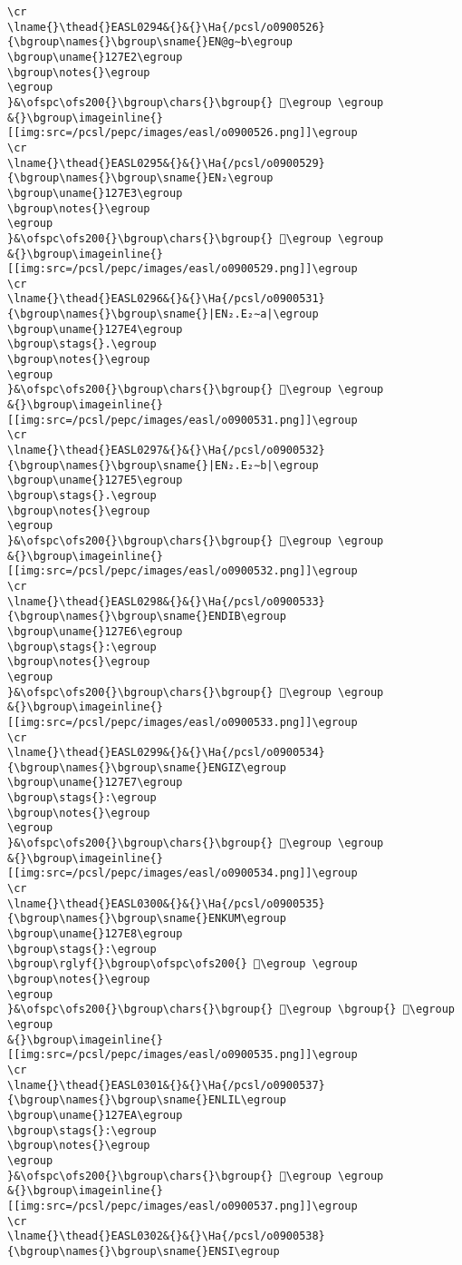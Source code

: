 \begin{verbatim}
\cr
\lname{}\thead{}EASL0294&{}&{}\Ha{/pcsl/o0900526}{\bgroup\names{}\bgroup\sname{}EN@g∼b\egroup
\bgroup\uname{}127E2\egroup
\bgroup\notes{}\egroup
\egroup
}&\ofspc\ofs200{}\bgroup\chars{}\bgroup{} 𒟢\egroup \egroup
&{}\bgroup\imageinline{}[[img:src=/pcsl/pepc/images/easl/o0900526.png]]\egroup
\cr
\lname{}\thead{}EASL0295&{}&{}\Ha{/pcsl/o0900529}{\bgroup\names{}\bgroup\sname{}EN₂\egroup
\bgroup\uname{}127E3\egroup
\bgroup\notes{}\egroup
\egroup
}&\ofspc\ofs200{}\bgroup\chars{}\bgroup{} 𒟣\egroup \egroup
&{}\bgroup\imageinline{}[[img:src=/pcsl/pepc/images/easl/o0900529.png]]\egroup
\cr
\lname{}\thead{}EASL0296&{}&{}\Ha{/pcsl/o0900531}{\bgroup\names{}\bgroup\sname{}|EN₂.E₂∼a|\egroup
\bgroup\uname{}127E4\egroup
\bgroup\stags{}.\egroup
\bgroup\notes{}\egroup
\egroup
}&\ofspc\ofs200{}\bgroup\chars{}\bgroup{} 𒟤\egroup \egroup
&{}\bgroup\imageinline{}[[img:src=/pcsl/pepc/images/easl/o0900531.png]]\egroup
\cr
\lname{}\thead{}EASL0297&{}&{}\Ha{/pcsl/o0900532}{\bgroup\names{}\bgroup\sname{}|EN₂.E₂∼b|\egroup
\bgroup\uname{}127E5\egroup
\bgroup\stags{}.\egroup
\bgroup\notes{}\egroup
\egroup
}&\ofspc\ofs200{}\bgroup\chars{}\bgroup{} 𒟥\egroup \egroup
&{}\bgroup\imageinline{}[[img:src=/pcsl/pepc/images/easl/o0900532.png]]\egroup
\cr
\lname{}\thead{}EASL0298&{}&{}\Ha{/pcsl/o0900533}{\bgroup\names{}\bgroup\sname{}ENDIB\egroup
\bgroup\uname{}127E6\egroup
\bgroup\stags{}:\egroup
\bgroup\notes{}\egroup
\egroup
}&\ofspc\ofs200{}\bgroup\chars{}\bgroup{} 𒟦\egroup \egroup
&{}\bgroup\imageinline{}[[img:src=/pcsl/pepc/images/easl/o0900533.png]]\egroup
\cr
\lname{}\thead{}EASL0299&{}&{}\Ha{/pcsl/o0900534}{\bgroup\names{}\bgroup\sname{}ENGIZ\egroup
\bgroup\uname{}127E7\egroup
\bgroup\stags{}:\egroup
\bgroup\notes{}\egroup
\egroup
}&\ofspc\ofs200{}\bgroup\chars{}\bgroup{} 𒟧\egroup \egroup
&{}\bgroup\imageinline{}[[img:src=/pcsl/pepc/images/easl/o0900534.png]]\egroup
\cr
\lname{}\thead{}EASL0300&{}&{}\Ha{/pcsl/o0900535}{\bgroup\names{}\bgroup\sname{}ENKUM\egroup
\bgroup\uname{}127E8\egroup
\bgroup\stags{}:\egroup
\bgroup\rglyf{}\bgroup\ofspc\ofs200{} 𒟨\egroup \egroup
\bgroup\notes{}\egroup
\egroup
}&\ofspc\ofs200{}\bgroup\chars{}\bgroup{} 𒟨\egroup \bgroup{} 𒟩\egroup \egroup
&{}\bgroup\imageinline{}[[img:src=/pcsl/pepc/images/easl/o0900535.png]]\egroup
\cr
\lname{}\thead{}EASL0301&{}&{}\Ha{/pcsl/o0900537}{\bgroup\names{}\bgroup\sname{}ENLIL\egroup
\bgroup\uname{}127EA\egroup
\bgroup\stags{}:\egroup
\bgroup\notes{}\egroup
\egroup
}&\ofspc\ofs200{}\bgroup\chars{}\bgroup{} 𒟪\egroup \egroup
&{}\bgroup\imageinline{}[[img:src=/pcsl/pepc/images/easl/o0900537.png]]\egroup
\cr
\lname{}\thead{}EASL0302&{}&{}\Ha{/pcsl/o0900538}{\bgroup\names{}\bgroup\sname{}ENSI\egroup

\end{verbatim}
